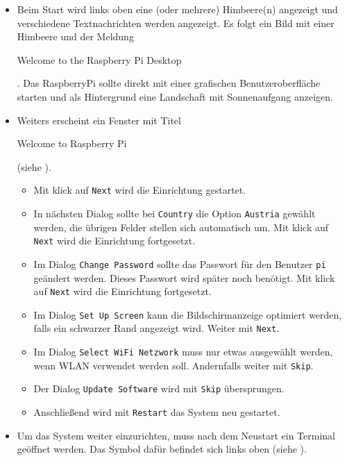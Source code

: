 \begin{itemize}
{		Als letztes wird die Stromversorgung angeschlossen und das RaspberryPi startet automatisch.
		}
	\item {Beim Start wird links oben eine (oder mehrere) Himbeere(n) angezeigt und verschiedene Textnachrichten werden angezeigt. 
		Es folgt ein Bild mit einer Himbeere und der Meldung \begin{em}Welcome to the Raspberry Pi Desktop\end{em}. 
		Das RaspberryPi sollte direkt mit einer grafischen Benutzeroberfläche starten und als Hintergrund eine Landschaft mit Sonnenaufgang anzeigen.
		}
	\item {Weiters erscheint ein Fenster mit Titel \begin{em}Welcome to Raspberry Pi\end{em} (siehe ).
		\begin{itemize}
		\item {Mit klick auf \lstinline|Next| wird die Einrichtung gestartet.}
		\item {In nächsten Dialog sollte bei \lstinline|Country| die Option \lstinline|Austria| gewählt werden, die übrigen Felder stellen sich automatisch um.
		      Mit klick auf \lstinline|Next| wird die Einrichtung fortgesetzt.}
		\item {Im Dialog \lstinline|Change Password| sollte das Passwort für den Benutzer \lstinline|pi| geändert werden.
		      Dieses Passwort wird später noch benötigt.
		      Mit klick auf \lstinline|Next| wird die Einrichtung fortgesetzt.}
		\item {Im Dialog \lstinline|Set Up Screen| kann die Bildschirmanzeige optimiert werden, falls ein schwarzer Rand angezeigt wird.
		      Weiter mit \lstinline|Next|.}
		\item {Im Dialog \lstinline|Select WiFi Netzwork| muss nur etwas ausgewählt werden, wenn WLAN verwendet werden soll.
		      Andernfalls weiter mit \lstinline|Skip|.}
		\item {Der Dialog \lstinline|Update Software| wird mit \lstinline|Skip| übersprungen.}
		\item {Anschließend wird mit \lstinline|Restart| das System neu gestartet.}
		\end{itemize}
		}
	\item {Um das System weiter einzurichten, muss nach dem Neustart ein Terminal geöffnet werden.
		Das Symbol dafür befindet sich links oben (siehe ).
}
\end{itemize}
